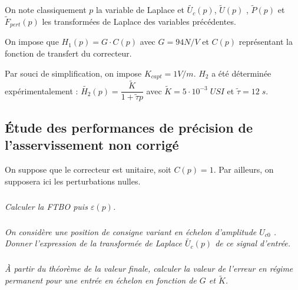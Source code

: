\documentclass[11pt,oneside]{article}
\begin{document}
{On note classiquement $p$ la variable de Laplace et $\tilde{U_c}(p)$, $\tilde{U}(p)$ , $\tilde{P}(p)$ et $\tilde{F}_{pert}(p)$ les transformées de Laplace des variables précédentes.

On impose que $H_1(p)=G\cdot C(p)$ avec $G=94 N/V$ et $C(p)$ représentant la fonction de transfert du correcteur. 

Par souci de simplification, on impose $K_{capt}=1V/m$. $H_2$ a été déterminée expérimentalement : $\tilde{H_2}(p)=\dfrac{\tilde{K}}{1+\tilde{\tau}p}$ avec $\tilde{K}=5\cdot 10^{-3}\; USI$ et $\tilde{\tau} = 12\; s.$
}
\subsection{Étude des performances de précision de l'asservissement non corrigé}

On suppose que le correcteur est unitaire, soit $C(p)=1$. Par ailleurs, on supposera ici les perturbations nulles.

\subparagraph{}
\textit{Calculer la FTBO puis $\varepsilon(p)$. }


\subparagraph{}
\textit{On considère une position de consigne variant en échelon d'amplitude $U_{c0}$ . Donner l'expression de la transformée de Laplace $\tilde{U_c}(p)$ de ce signal d'entrée.}


\subparagraph{}
\textit{\`A partir du théorème de la valeur finale, calculer la valeur de l'erreur en régime permanent pour une entrée en échelon en fonction de $G$ et $\tilde{K}$.}
\end{document}
